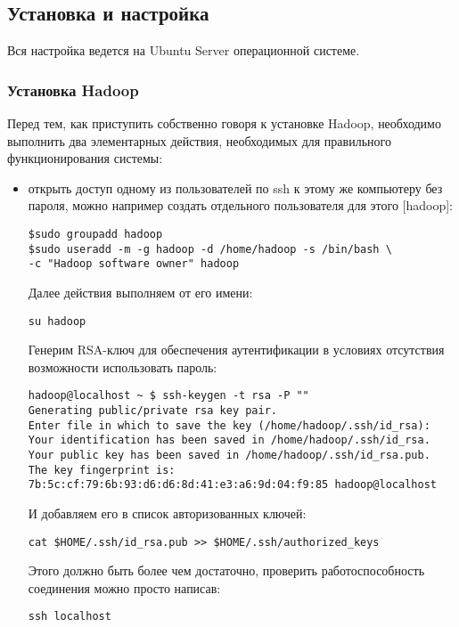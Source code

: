 \subsection{Установка и настройка}
Вся настройка ведется на Ubuntu Server операционной системе.

\subsubsection{Установка Hadoop}
Перед тем, как приступить собственно говоря к установке Hadoop, необходимо выполнить два элементарных действия, 
необходимых для правильного функционирования системы:
\begin{itemize}
\item открыть доступ одному из пользователей по ssh к этому же компьютеру без пароля, 
можно например создать отдельного пользователя для этого [hadoop]:
\begin{lstlisting}[label=lst:haddop1,caption=Создаем пользователя с правами]
$sudo groupadd hadoop
$sudo useradd -m -g hadoop -d /home/hadoop -s /bin/bash \
-c "Hadoop software owner" hadoop
\end{lstlisting}

Далее действия выполняем от его имени:
\begin{lstlisting}[label=lst:haddop2,caption=Логинимся под пользователем hadoop]
su hadoop
\end{lstlisting}

Генерим RSA-ключ для обеспечения аутентификации в условиях отсутствия возможности использовать пароль:
\begin{lstlisting}[label=lst:haddop3,caption=Генерим RSA-ключ]
hadoop@localhost ~ $ ssh-keygen -t rsa -P ""
Generating public/private rsa key pair.
Enter file in which to save the key (/home/hadoop/.ssh/id_rsa):
Your identification has been saved in /home/hadoop/.ssh/id_rsa.
Your public key has been saved in /home/hadoop/.ssh/id_rsa.pub.
The key fingerprint is:
7b:5c:cf:79:6b:93:d6:d6:8d:41:e3:a6:9d:04:f9:85 hadoop@localhost
\end{lstlisting}

И добавляем его в список авторизованных ключей:
\begin{lstlisting}[label=lst:haddop4,caption=Добавляем его в список авторизованных ключей]
cat $HOME/.ssh/id_rsa.pub >> $HOME/.ssh/authorized_keys
\end{lstlisting}

Этого должно быть более чем достаточно, проверить работоспособность соединения можно просто написав:
\begin{lstlisting}[label=lst:haddop5,caption=Пробуем зайти на ssh без пароля]
ssh localhost
\end{lstlisting}


\end{itemize}
